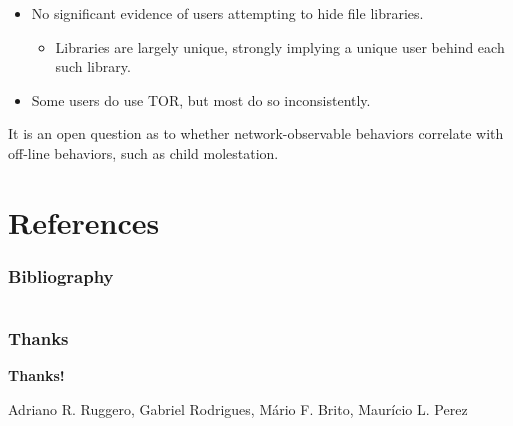 \documentclass[notes]{beamer}
\begin{document}
\begin{frame}

\begin{itemize}

\item[\checkmark]No significant evidence of users attempting to hide file libraries.

	\begin{itemize}

	\item Libraries are largely unique, strongly implying a unique user behind each such library.
	
	\end{itemize}

\item[\checkmark]Some users do use TOR, but most do so inconsistently.

\end{itemize}

\end{frame}

\begin{frame}

\begin{block}

It is an open question as to whether network-observable
behaviors correlate with off-line behaviors, such as
child molestation.

\end{block}

\end{frame}

\section{References}
\begin{frame} %

\frametitle{Bibliography}




\end{frame}

\section{}
\begin{frame}
\frametitle{Thanks}
\vskip30pt

\begin{center}
{\bf \color{alert} Thanks!}
\end{center}

\vskip30pt

\begin{center}

\vskip12pt

Adriano R. Ruggero, Gabriel Rodrigues, Mário F. Brito, Maurício L. Perez

\end{center}

\end{frame}
\end{document}

